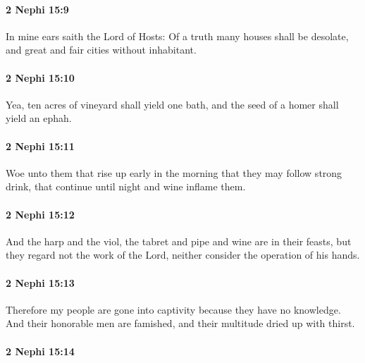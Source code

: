 		\paragraph{2 Nephi 15:9} %
			\label{2NEPHI-15-9}

			In mine ears saith the Lord of Hosts:
			Of a truth many houses shall be desolate,
			and great and fair cities without inhabitant.

		\paragraph{2 Nephi 15:10} %
			\label{2NEPHI-15-10}

			Yea, ten acres of vineyard shall yield one bath,
			and the seed of a homer shall yield an ephah.

		\paragraph{2 Nephi 15:11} %
			\label{2NEPHI-15-11}

			Woe unto them that rise up early in the morning
			that they may follow strong drink,
			that continue until night and wine inflame them.

		\paragraph{2 Nephi 15:12} %
			\label{2NEPHI-15-12}

			And the harp and the viol,
			the tabret and pipe and wine are in their feasts,
			but they regard not the work of the Lord,
			neither consider the operation of his hands.

		\paragraph{2 Nephi 15:13} %
			\label{2NEPHI-15-13}

			Therefore my people are gone into captivity
			because they have no knowledge.
			And their honorable men are famished,
			and their multitude dried up with thirst.

		\paragraph{2 Nephi 15:14} %
			\label{2NEPHI-15-14}

